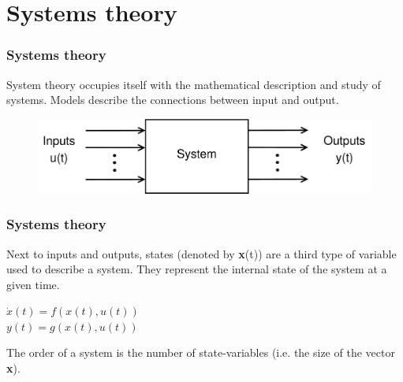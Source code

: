 \documentclass{beamer}
\begin{document}

\begin{frame}
\frametitle{}
\end{frame}

\section{Systems theory} 

\begin{frame}
\frametitle{Systems theory}
System theory occupies itself with the mathematical description and study of systems.
Models describe the connections between input and output.\\
\bigskip
\begin{figure}
\includegraphics[width=.9\linewidth]{systems_theory}
\end{figure}
\bigskip
\end{frame}


\begin{frame}
\frametitle{Systems theory}
Next to inputs and outputs, states (denoted by \textbf x(t)) are a third type of variable used to describe a system. They represent the internal state of the system at a given time.\\
\begin{center}
$\dot{x}(t) = f(x(t),u(t))$\\
$y(t) = g(x(t),u(t))$\\
\end{center}
The order of a system is the number of state-variables (i.e. the size of the vector \textbf x).\\
\bigskip
\end{frame}

\end{document}
